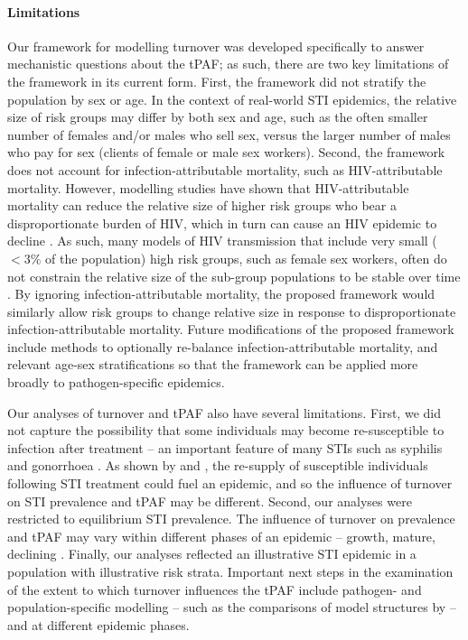 \paragraph{Limitations}
Our framework for modelling turnover was developed
specifically to answer mechanistic questions about the tPAF;
as such, there are two key limitations of the framework in its current form.
First, the framework did not stratify the population by sex or age.
In the context of real-world STI epidemics,
the relative size of risk groups may differ by both sex and age,
such as the often smaller number of females and/or males who sell sex,
versus the larger number of males who pay for sex (clients of female or male sex workers).
Second, the framework does not account for
infection-attributable mortality, such as HIV-attributable mortality.
However, modelling studies have shown that HIV-attributable mortality can reduce the
relative size of higher risk groups who bear a disproportionate burden of HIV,
which in turn can cause an HIV epidemic to decline \citep{Boily1997}.
As such, many models of HIV transmission that include
very small ($<3\%$ of the population) high risk groups, such as female sex workers,
often do not constrain the relative size
of the sub-group populations to be stable over time \citep{Pickles2013}.
By ignoring infection-attributable mortality,
the proposed framework would similarly allow risk groups to change relative size
in response to disproportionate infection-attributable mortality.
Future modifications of the proposed framework include methods to optionally re-balance
infection-attributable mortality, and relevant age-sex stratifications so that
the framework can be applied more broadly to pathogen-specific epidemics.
\par
Our analyses of turnover and tPAF also have several limitations.
First, we did not capture the possibility that some individuals may become
re-susceptible to infection after treatment
-- an important feature of many STIs such as syphilis and gonorrhoea \citep{Fenton2008}.
As shown by \citet{Fenton2008} and \citet{Pourbohloul2003},
the re-supply of susceptible individuals following STI treatment
could fuel an epidemic, and so the influence of turnover on
STI prevalence and tPAF may be different.
Second, our analyses were restricted to equilibrium STI prevalence.
The influence of turnover on prevalence and tPAF
may vary within different phases of an epidemic
-- growth, mature, declining \citep{Wasserheit1996}.
Finally, our analyses reflected an illustrative STI epidemic
in a population with illustrative risk strata.
Important next steps in the examination of
the extent to which turnover influences the tPAF include
pathogen- and population-specific modelling
-- such as the comparisons of model structures by \citet{Hontelez2013,Johnson2016} --
and at different epidemic phases.
